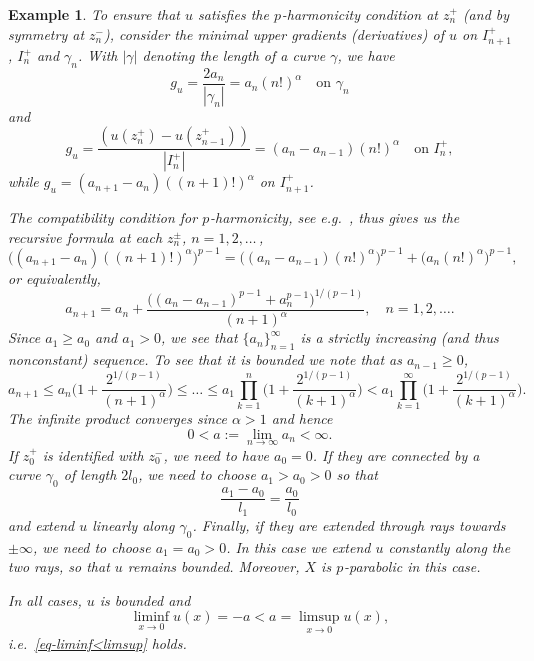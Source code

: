 \documentclass[a4paper,twoside]{article}
\theoremstyle{propositional}
\theoremstyle{descriptive}
\newtheorem{example}[thm]{Example}
\theoremstyle{remarkstyle}
\newcommand{\al}{\alpha}
\newcommand{\ga}{\gamma}
\newcommand{\p}{{$p\mspace{1mu}$}}
\newcommand{\zpm}{z^\pm}
\newcommand{\zpl}{z^+}
\newcommand{\zmin}{z^-}
\newcommand{\Ipl}{I^+}
\numberwithin{equation}{section}
\begin{document}
\begin{example}
To ensure that $u$ satisfies the \p-harmonicity condition at $\zpl_n$
(and by symmetry at $\zmin_n$),
consider the minimal upper gradients (derivatives) of $u$ on 
$\Ipl_{n+1}$, $\Ipl_{n}$ and $\ga_n$.
With $|\ga|$ denoting the length of a curve $\ga$, we have
\[
g_u = \frac{2a_n}{|\ga_n|} =
 a_n (n!)^\al \quad \text{on } \ga_n
\]
and
\[
g_u = \frac{(u(\zpl_n)-u(\zpl_{n-1}))}{|\Ipl_n|} = (a_n-a_{n-1})(n!)^\al
\quad \text{on } \Ipl_{n},
\] 
while $g_u=(a_{n+1}-a_n)((n+1)!)^\al$ on $\Ipl_{n+1}$.

The compatibility condition for \p-harmonicity, see e.g.\
\cite[Section~A.5]{BBbook}, thus gives us
the recursive formula at each $\zpm_n$, $n=1,2,\dots$\,,
\begin{equation} \label{eq-recursive}
\bigl( (a_{n+1}-a_n)((n+1)!)^\al \bigr)^{p-1} 
  = \bigl( (a_n-a_{n-1})(n!)^\al)^{p-1} + \bigl(a_n (n!)^\al \bigr)^{p-1},
\end{equation}
or equivalently,
\[
a_{n+1} = a_n + \frac{\bigl( (a_n-a_{n-1})^{p-1} + a_n^{p-1} \bigr)^{1/(p-1)}}{(n+1)^\al},
\quad n=1,2,\dots.
\]
Since $a_1\ge a_0$ and $a_1>0$, 
we see that $\{a_n\}_{n=1}^\infty$ is a strictly increasing 
(and thus nonconstant) sequence.
To see that it is bounded we note that as $a_{n-1}\ge0$,
\[
a_{n+1} \le a_n \biggl( 1+\frac{2^{1/(p-1)}}{(n+1)^\al} \biggr) \le \dots \le
     a_1 \prod_{k=1}^n \biggl( 1+\frac{2^{1/(p-1)}}{(k+1)^\al} \biggr)
   < a_1 \prod_{k=1}^\infty \biggl( 1+\frac{2^{1/(p-1)}}{(k+1)^\al} \biggr).
\]
The infinite product converges since $\al>1$ and hence 
\begin{equation*} %
0 <a:= \lim_{n\to\infty} a_n <\infty.
\end{equation*}
If $\zpl_0$ is identified with $\zmin_0$, we need to have
$a_0=0$.
If they are connected by a curve $\ga_0$ of length $2l_0$, we need to
choose $a_1 > a_0 >0$ so that
\[
  \frac{a_1-a_0}{l_1}=\frac{a_0}{l_0}
\]
and extend $u$ linearly along $\ga_0$.  
Finally, if they are extended through rays towards $\pm\infty$,
we need to choose $a_1=a_0>0$.
In this case we extend $u$ constantly along the two rays,
so that $u$ remains bounded.
Moreover, $X$ is \p-parabolic in this case.
 
In all cases, $u$ is bounded and
\[
\liminf_{x \to 0} u(x)=-a  < a =     \limsup_{x \to 0} u(x),
\]
i.e.\  \eqref{eq-liminf<limsup} holds.
\end{example}
\end{document}
